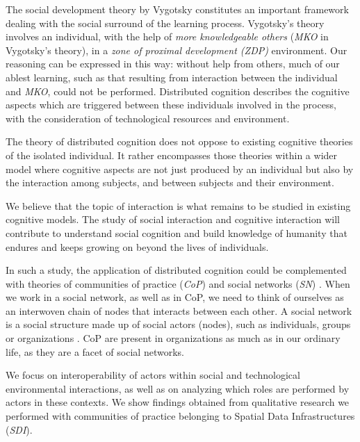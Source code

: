 \documentclass[10pt,twocolumn,ieeetran]{article}
\newcommand{\nonota}[1]{#1}
\begin{document}
The social development theory by Vygotsky \cite{Wertsch} constitutes an important framework 
dealing with the social surround of the learning process. Vygotsky's theory involves an individual, with the help of {\it more knowledgeable others} ({\it MKO} in Vygotsky's theory), in a {\it zone of proximal development (ZDP)} environment. Our reasoning can be expressed in this way: without help from others, much of our ablest learning, such as that resulting from interaction between the individual and {\it MKO},  could not be performed. Distributed cognition describes the cognitive aspects which are triggered between these individuals involved in the process, with the consideration of technological resources and environment.

The theory of distributed cognition \cite{Salomon} does not oppose to existing cognitive theories of the isolated individual. It rather encompasses those theories within a wider model where cognitive aspects are not just produced by an individual but also by the interaction among subjects, and between subjects and their environment.

We believe that the topic of interaction is what remains to be studied in existing cognitive models. The study of social interaction and cognitive interaction will contribute to understand social cognition and build knowledge of humanity \cite{Denny} that endures and keeps growing on beyond the lives of individuals.

In such a study, the application of distributed cognition could be \nonota{complemented with theories of } communities of practice ({\it CoP}) \cite{Wenger} and social networks ({\it SN}) \cite{Kadushin}\cite{Santos}\cite{Watts}. When we work in a social network, as well as in CoP, we need to think of ourselves as an interwoven chain of nodes that interacts between each other. A social network is a social structure made up of social actors (nodes), such as individuals, groups or organizations \cite{Wasserman}\cite{Jamali}. CoP are present in organizations as much as in our ordinary life, as they are a facet of social networks.

We focus on interoperability of actors within social and technological environmental interactions, as well as on analyzing which roles are performed by actors in these contexts. We show findings obtained from qualitative 
research we performed with communities of practice belonging to Spatial Data Infrastructures ({\it SDI}). 
\end{document}
